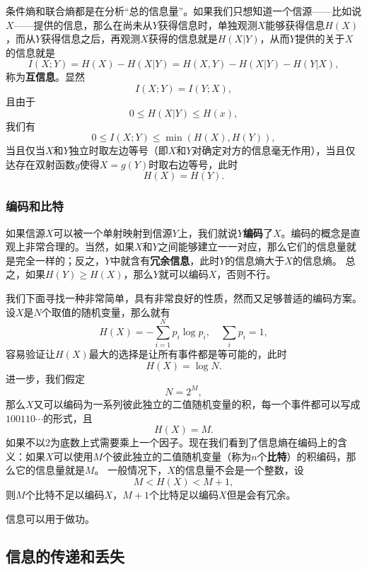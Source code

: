 \documentclass[UTF8, a4paper]{ctexart}
\begin{document}
条件熵和联合熵都是在分析“总的信息量”。如果我们只想知道一个信源——比如说$X$——提供的信息，那么在尚未从$Y$获得信息时，单独观测$X$能够获得信息$H(X)$，而从$Y$获得信息之后，再观测$X$获得的信息就是$H(X|Y)$，从而$Y$提供的关于$X$的信息就是
\begin{equation}
    I(X;Y) = H(X) - H(X|Y) = H(X, Y) - H(X|Y) - H(Y|X),
\end{equation}
称为\textbf{互信息}。显然
\begin{equation}
    I(X;Y) = I(Y;X),
\end{equation}
且由于
\[
    0 \leq H(X|Y) \leq H(x),
\]
我们有
\begin{equation}
    0 \leq I(X;Y) \leq \min(H(X), H(Y)),
\end{equation}
当且仅当$X$和$Y$独立时取左边等号（即$X$和$Y$对确定对方的信息毫无作用），当且仅达存在双射函数$g$使得$X=g(Y)$时取右边等号，此时
\[
    H(X) = H(Y).
\]

\subsubsection{编码和比特}

如果信源$X$可以被一个单射映射到信源$Y$上，我们就说$Y$\textbf{编码}了$X$。编码的概念是直观上非常合理的。当然，如果$X$和$Y$之间能够建立一一对应，那么它们的信息量就是完全一样的；反之，$Y$中就含有\textbf{冗余信息}，此时$Y$的信息熵大于$X$的信息熵。
总之，如果$H(Y) \geq H(X)$，那么$Y$就可以编码$X$，否则不行。

我们下面寻找一种非常简单，具有非常良好的性质，然而又足够普适的编码方案。设$X$是$N$个取值的随机变量，那么就有
\[
    H(X) = - \sum_{i=1}^N p_i \log p_i, \quad \sum_i p_i = 1,
\]
容易验证让$H(X)$最大的选择是让所有事件都是等可能的，此时
\begin{equation}
    H(X) = \log N.
\end{equation}
进一步，我们假定
\[
    N = 2^M,
\]
那么$X$又可以编码为一系列彼此独立的二值随机变量的积，每一个事件都可以写成$100110\cdots$的形式，且
\[
    H(X) = M.
\]
如果不以$2$为底数上式需要乘上一个因子。现在我们看到了信息熵在编码上的含义：如果$X$可以使用$M$个彼此独立的二值随机变量（称为$n$个\textbf{比特}）的积编码，那么它的信息量就是$M$。
一般情况下，$X$的信息量不会是一个整数，设
\[
    M < H(X) < M+1,
\]
则$M$个比特不足以编码$X$，$M+1$个比特足以编码$X$但是会有冗余。

信息可以用于做功。

\subsection{信息的传递和丢失}
\end{document}
